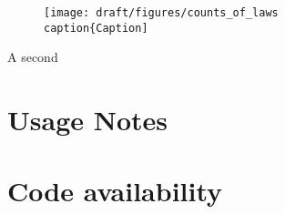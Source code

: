 \documentclass[fleqn,10pt]{wlscirep}
\begin{document}
\begin{figure}
    \centering
    \texttt{[image: draft/figures/counts\_of\_laws  
    \\caption\{Caption]}
    \label{fig:enter-label}
\end{figure}
A second 

\section*{Usage Notes}  \label{sec:usage}



\section*{Code availability}




\end{document}
